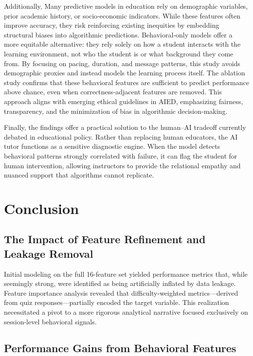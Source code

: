 \documentclass[conference]{IEEEtran}
\begin{document}
Additionally, Many predictive models in education rely on demographic variables, prior academic history, or socio‑economic indicators. While these features often improve accuracy, they risk reinforcing existing inequities by embedding structural biases into algorithmic predictions. Behavioral‑only models offer a more equitable alternative: they rely solely on how a student interacts with the learning environment, not who the student is or what background they come from. By focusing on pacing, duration, and message patterns, this study avoids demographic proxies and instead models the learning process itself. The ablation study confirms that these behavioral features are sufficient to predict performance above chance, even when correctness‑adjacent features are removed. This approach aligns with emerging ethical guidelines in AIED, emphasizing fairness, transparency, and the minimization of bias in algorithmic decision‑making.

Finally, the findings offer a practical solution to the human–AI tradeoff currently debated in educational policy. Rather than replacing human educators, the AI tutor functions as a sensitive diagnostic engine. When the model detects behavioral patterns strongly correlated with failure, it can flag the student for human intervention, allowing instructors to provide the relational empathy and nuanced support that algorithms cannot replicate.

\section{Conclusion}

\subsection {The Impact of Feature Refinement and Leakage Removal}

Initial modeling on the full 16-feature set yielded performance metrics that, while seemingly strong, were identified as being artificially inflated by data leakage. Feature importance analysis revealed that difficulty-weighted metrics—derived from quiz responses—partially encoded the target variable. This realization necessitated a pivot to a more rigorous analytical narrative focused exclusively on session-level behavioral signals.


\subsection{Performance Gains from Behavioral Features}
\end{document}
